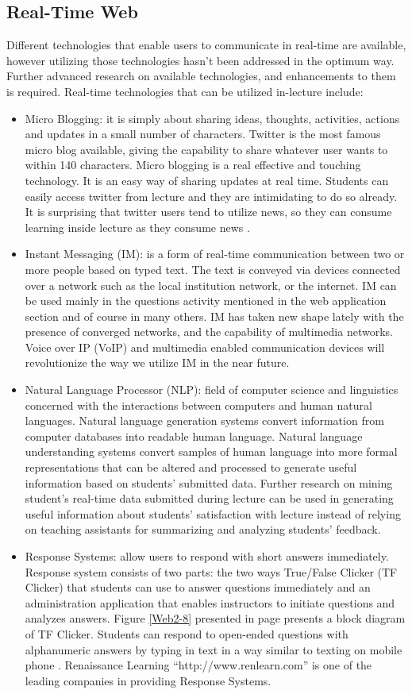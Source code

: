 \documentclass[12pt,a4paper,final,twoside,onecolumn,titlepage]{book}
\begin{document}
\subsection{Real-Time Web}
Different technologies that enable users to communicate in real-time are available, however utilizing those technologies hasn’t been addressed in the optimum way. Further advanced research on available technologies, and enhancements to them is required. Real-time technologies that can be utilized in-lecture include:
\begin{itemize}
\item Micro Blogging: it is simply about sharing ideas, thoughts, activities, actions and updates in a small number of characters. Twitter is the most famous micro blog available, giving the capability to share whatever user wants to within 140 characters. Micro blogging is a real effective and touching technology. It is an easy way of sharing updates at real time. Students can easily access twitter from lecture and they are intimidating to do so already. It is surprising that twitter users tend to utilize news, so they can consume learning inside lecture as they consume news \cite{W04}.
\item Instant Messaging (IM): is a form of real-time communication between two or more people based on typed text. The text is conveyed via devices connected over a network such as the local institution network, or the internet. IM can be used mainly in the questions activity mentioned in the web application section and of course in many others. IM has taken new shape lately with the presence of converged networks, and the capability of multimedia networks. Voice over IP (VoIP) and multimedia enabled communication devices will revolutionize the way we utilize IM in the near future.
\item Natural Language Processor (NLP): field of computer science and linguistics concerned with the interactions between computers and human natural languages. Natural language generation systems convert information from computer databases into readable human language. Natural language understanding systems convert samples of human language into more formal representations that can be altered and processed to generate useful information based on students’ submitted data. Further research on mining student’s real-time data submitted during lecture can be used in generating useful information about students’ satisfaction with lecture instead of relying on teaching assistants for summarizing and analyzing students’ feedback.
\item Response Systems: allow users to respond with short answers immediately. Response system consists of two parts: the two ways True/False Clicker (TF Clicker) that students can use to answer questions immediately and an administration application that enables instructors to initiate questions and analyzes answers. Figure \ref{Web2-8} presented in page \pageref{Web2-8} presents a block diagram of TF Clicker. Students can respond to open-ended questions with alphanumeric answers by typing in text in a way similar to texting on mobile phone \cite{W16}. Renaissance Learning “http://www.renlearn.com” is one of the leading companies in providing Response Systems.

\end{itemize}
\end{document}
